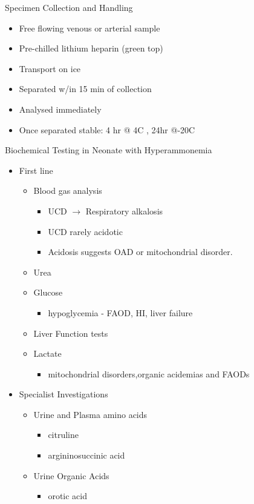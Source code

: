 \documentclass[presentation, smaller]{beamer}
\begin{document}
\begin{frame}[label={sec:orgheadline15}]{Specimen Collection and Handling}
\begin{itemize}
\item Free flowing venous or arterial sample
\item Pre-chilled lithium heparin (green top)
\item Transport on ice
\item Separated w/in 15 min of collection
\item Analysed immediately
\item Once separated stable: 4 hr @ 4\textdegree C , 24hr @-20\textdegree C
\end{itemize}
\end{frame}

\begin{frame}[label={sec:orgheadline16}]{Biochemical Testing in Neonate with Hyperammonemia}
\begin{itemize}
\item First line
\begin{itemize}
\item Blood gas analysis
\begin{itemize}
\item UCD \(\to\) Respiratory alkalosis
\item UCD rarely acidotic
\item Acidosis suggests OAD or mitochondrial disorder.
\end{itemize}
\item Urea
\item Glucose
\begin{itemize}
\item hypoglycemia - FAOD, HI, liver failure
\end{itemize}
\item Liver Function tests
\item Lactate
\begin{itemize}
\item mitochondrial disorders,organic acidemias and FAODs
\end{itemize}
\end{itemize}

\item Specialist Investigations
\begin{itemize}
\item Urine and Plasma amino acids
\begin{itemize}
\item citruline
\item argininosuccinic acid
\end{itemize}
\item Urine Organic Acids
\begin{itemize}
\item orotic acid
\end{itemize}
\end{itemize}
\end{itemize}
\end{frame}
\end{document}
